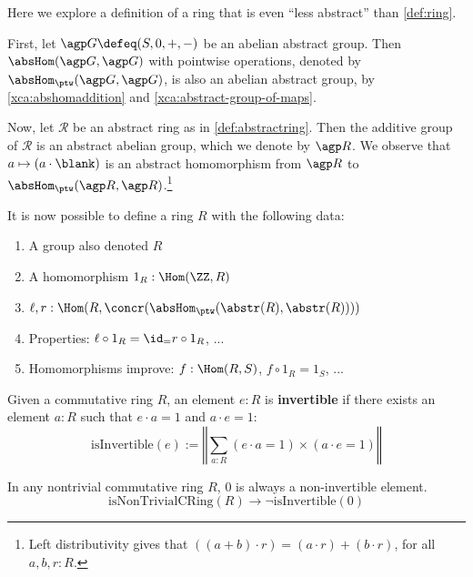 \begin{remark}\label{rem:ring}
Here we explore a definition of a ring that is even
``less abstract'' than \cref{def:ring}.

First, let $\agp G \defeq(S,0,+,-)$ be an abelian abstract group.
Then $\absHom(\agp G,\agp G)$ with pointwise operations,
denoted by $\absHom_{\ptw}(\agp G,\agp G)$, is also
an abelian abstract group, by  \cref{xca:abshomaddition} and
\cref{xca:abstract-group-of-maps}.

Now, let $\mathscr R$ be an abstract ring as in \cref{def:abstractring}.
Then the additive group of $\mathscr R$ is an abstract abelian group,
which we denote by $\agp R$. We observe that
$a\mapsto(a\cdot\blank)$ is an abstract homomorphism
from $\agp R$ to $\absHom_{\ptw}(\agp R,\agp R)$.\footnote{%
Left distributivity gives that $((a+b)\cdot r) = (a\cdot r)+(b\cdot r)$,
for all $a,b,r:R$.}

It is now possible to define a ring $R$ with the following data:
\begin{enumerate}
\item A group also denoted $R$
\item A homomorphism $1_R:\Hom(\ZZ,R)$
\item $\ell,r: \Hom(R,\concr(\absHom_{\ptw}(\abstr(R),\abstr(R))))$ 
\item Properties: $\ell\circ 1_R = \id_\MB{???} = r\circ 1_R$, ...
\item Homomorphisms improve: $f:\Hom(R,S)$, $f\circ 1_R = 1_S$, ...
\end{enumerate}
\end{remark}









\begin{definition}
Given a commutative ring $R$, an element $e:R$ is \textbf{invertible} if there exists an element $a:R$ such that $e \cdot a = 1$ and $a \cdot e = 1$:
$$\mathrm{isInvertible}(e) := \left\Vert\sum_{a:R} (e \cdot a = 1) \times (a \cdot e = 1)\right\Vert$$
\end{definition}

\begin{theorem}
In any nontrivial commutative ring $R$, $0$ is always a non-invertible element. 
$$\mathrm{isNonTrivialCRing}(R) \to \neg \mathrm{isInvertible}(0)$$
\end{theorem}

